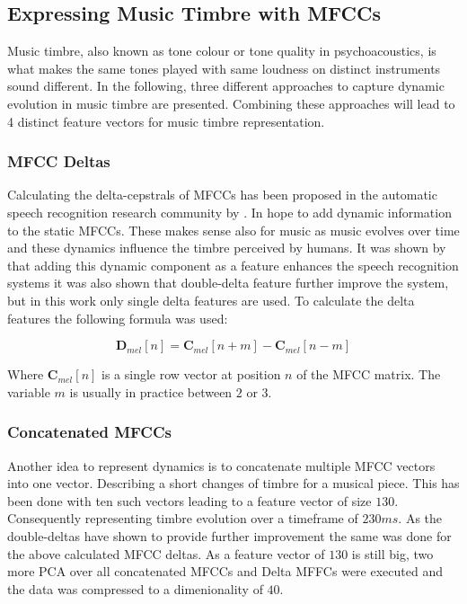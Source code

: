 \documentclass[cic,tc,english]{iiufrgs}
\begin{document}
\subsection{Expressing Music Timbre with MFCCs}
Music timbre, also known as tone colour or tone quality in psychoacoustics, is what makes the same tones played with same loudness on distinct instruments sound different. In the following, three different approaches to capture dynamic evolution in music timbre are presented. Combining these approaches will lead to 4 distinct feature vectors for music timbre representation.


\subsubsection{MFCC Deltas}
Calculating the delta-cepstrals of MFCCs has been proposed in the automatic speech recognition research community by \cite{furui1986speaker}. In hope to add dynamic information to the static MFCCs. These makes sense also for music as music evolves over time and these dynamics influence the timbre perceived by humans. It was shown by \cite{kumar2011delta} that adding this dynamic component as a feature enhances the speech recognition systems it was also shown that double-delta feature further improve the system, but in this work only single delta features are used. To calculate the delta features the following formula was used:

\begin{equation}
\bm{D}_{mel}[n] = \bm{C}_{mel}[n+m] - \bm{C}_{mel}[n-m]
\end{equation}

Where $ \bm{C}_{mel}[n]$ is a single row vector at position $n$ of the MFCC matrix. The variable $m$ is usually in practice between $2$ or $3$.

\subsubsection{Concatenated MFCCs}
Another idea to represent dynamics is to concatenate multiple MFCC vectors into one vector. Describing a short changes of timbre for a musical piece. This has been done with ten such vectors leading to a feature vector of size $130$. Consequently representing timbre evolution over a timeframe of $230ms$. As the double-deltas have shown to provide further improvement the same was done for the above calculated MFCC deltas. As a feature vector of $130$ is still big, two more PCA over all concatenated MFCCs and Delta MFFCs were executed and the data was compressed to a dimenionality of $40$.
\end{document}
